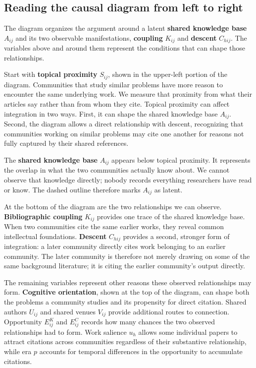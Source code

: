 \documentclass[11pt]{article}
\begin{document}
\subsection{Reading the causal diagram from left to right}

The diagram organizes the argument around a latent \textbf{shared knowledge base}
$A_{ij}$ and its two observable manifestations, \textbf{coupling} $K_{ij}$ and
\textbf{descent} $C_{hij}$. The variables above and around them represent the
conditions that can shape those relationships.

Start with \textbf{topical proximity} $S_{ij}$, shown in the upper-left portion of
the diagram. Communities that study similar problems have more reason to encounter
the same underlying work. We measure that proximity from what their articles say
rather than from whom they cite. Topical proximity can affect integration in two
ways. First, it can shape the shared knowledge base $A_{ij}$. Second, the diagram
allows a direct relationship with descent, recognizing that communities working on
similar problems may cite one another for reasons not fully captured by their shared
references.

The \textbf{shared knowledge base} $A_{ij}$ appears below topical proximity. It
represents the overlap in what the two communities actually know about. We cannot
observe that knowledge directly; nobody records everything researchers have read or
know. The dashed outline therefore marks $A_{ij}$ as latent.

At the bottom of the diagram are the two relationships we can observe.
\textbf{Bibliographic coupling} $K_{ij}$ provides one trace of the shared knowledge
base. When two communities cite the same earlier works, they reveal common
intellectual foundations. \textbf{Descent} $C_{hij}$ provides a second, stronger
form of integration: a later community directly cites work belonging to an earlier
community. The later community is therefore not merely drawing on some of the same
background literature; it is citing the earlier community's output directly.

The remaining variables represent other reasons these observed relationships may
form. \textbf{Cognitive orientation}, shown at the top of the diagram, can shape
both the problems a community studies and its propensity for direct citation.
Shared authors $U_{ij}$ and shared venues $V_{ij}$ provide additional routes to
connection. Opportunity $E^{K}_{ij}$ and $E^{C}_{ij}$ records how many chances the
two observed relationships had to form. Work salience $u_h$ allows some individual
papers to attract citations across communities regardless of their substantive
relationship, while era $p$ accounts for temporal differences in the opportunity
to accumulate citations.
\end{document}
